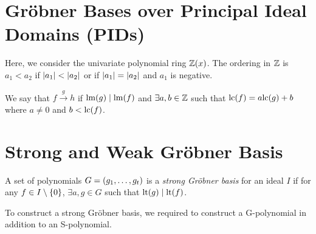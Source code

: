\documentclass[twoside]{article}
\begin{document}



\section{Gr\"{o}bner Bases over Principal Ideal Domains (PIDs)}
\label{sec:groebner-bases-over-pids}

Here, we consider the univariate polynomial ring \(\mathbb Z(x)\). The ordering
in \(\mathbb Z\) is \(a_1 < a_2\) if \(\left\vert a_1\right\vert < \left\vert a_2\right\vert\) or if \(\left\vert a_1\right\vert =
\left\vert a_2\right\vert\) and \(a_1\) is negative.

\begin{definition}[Reduction]
    We say that \(f \xrightarrow{g} h\) if \(\mathrm{lm}(g) \mid
    \mathrm{lm}(f)\) and \(\exists a, b \in \mathbb Z\) such that
    \(\mathrm{lc}(f) = a\mathrm{lc}(g) + b\) where \(a \neq 0\) and
    \(b < \mathrm{lc}(f)\).
\end{definition}

\section{Strong and Weak Gr\"{o}bner Basis}

\begin{definition}
    A set of polynomials \(G = (g_1, \ldots, g_t)\) is a \emph{strong
    Gr\"{o}bner basis} for an ideal \(I\) if for any \(f \in I \setminus
    \{0\}\), \(\exists a, g \in G\) such that \(\mathrm{lt}(g) \mid
    \mathrm{lt}(f)\).
\end{definition}

To construct a strong Gr\"{o}bner basis, we required to construct a G-polynomial
in addition to an S-polynomial.
\end{document}
